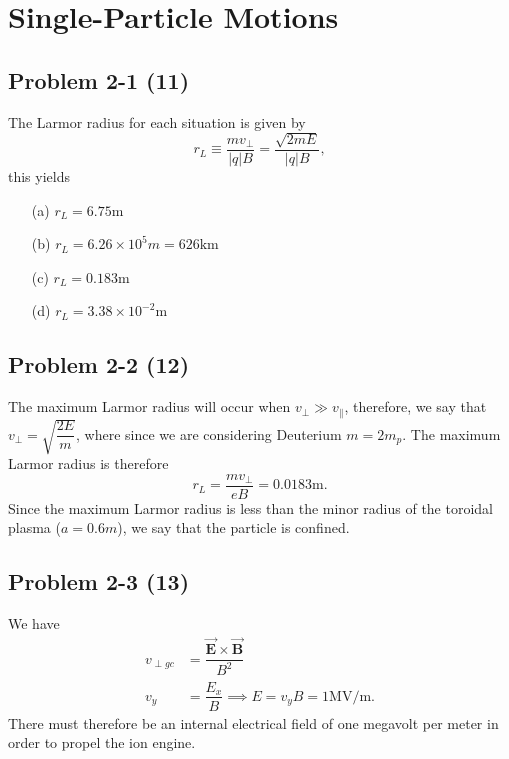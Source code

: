 \chapter{Single-Particle Motions}
\label{ch:Two}

\section*{Problem 2-1 (11)}
\label{sec:2-1}
The Larmor radius for each situation is given by 
\begin{equation*}
	r_L \equiv \dfrac{mv_\perp}{|q|B} = \dfrac{\sqrt{2mE}}{|q|B},
\end{equation*}
this yields
\begin{itemize}
	\item[(a)] \(r_L = 6.75\text{m} \)
	\item[(b)] \(r_L = 6.26\times10^{5}m = 626\text{km}\)
	\item[(c)] \(r_L = 0.183\text{m} \)
	\item[(d)] \(r_L = 3.38\times10^{-2}\text{m} \)
\end{itemize}

\section*{Problem 2-2 (12)}
\label{sec:2-2}
The maximum Larmor radius will occur when \(v_\perp \gg v_\parallel \), therefore, we say that \(v_\perp = \sqrt{\dfrac{2E}{m}} \), where since we are considering Deuterium \(m = 2m_p\). The maximum Larmor radius is therefore
\begin{equation*}
	r_L = \dfrac{mv_\perp}{eB} = 0.0183\text{m}.
\end{equation*} 
Since the maximum Larmor radius is less than the minor radius of the toroidal plasma (\(a = 0.6m\)), we say that the particle is confined.

\section*{Problem 2-3 (13)}
\label{sec:2-3}
We have
\begin{align*}
	v_{\perp gc} &= \dfrac{\vec{\textbf{E}}\times\vec{\textbf{B}}}{B^2} \\ 
	v_y &= \dfrac{E_x}{B} \implies
	E = v_yB = 1\text{MV/m}.
\end{align*}
There must therefore be an internal electrical field of one megavolt per meter in order to propel the ion engine. 


